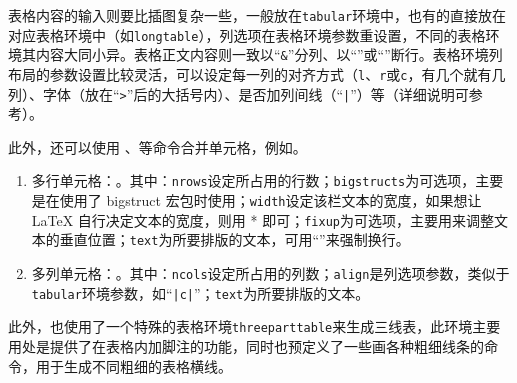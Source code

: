 表格内容的输入则要比插图复杂一些，一般放在\texttt{tabular}环境中，也有的直接放在对应表格环境中（如\texttt{longtable}），列选项在表格环境参数重设置，不同的表格环境其内容大同小异。表格正文内容则一致以“\texttt{\&}”分列、以“\ltxcmdname{\textbackslash}”或“”断行。表格环境列布局的参数设置比较灵活，可以设定每一列的对齐方式（\texttt{l}、\texttt{r}或\texttt{c}，有几个就有几列）、字体（放在“\texttt{>}”后的大括号内）、是否加列间线（“\texttt{|}”）等（详细说明可参考）。

此外，还可以使用 、等命令合并单元格，例如。
\begin{enumerate}
	\item 多行单元格：。其中：\texttt{nrows}设定所占用的行数；\texttt{bigstructs}为可选项，主要是在使用了 bigstruct 宏包时使用；\texttt{width}设定该栏文本的宽度，如果想让 LaTeX 自行决定文本的宽度，则用 * 即可；\texttt{fixup}为可选项，主要用来调整文本的垂直位置；\texttt{text}为所要排版的文本，可用“\ltxcmdname{\textbackslash}”来强制换行。
    \item 多列单元格：。其中：\texttt{ncols}设定所占用的列数；\texttt{align}是列选项参数，类似于\texttt{tabular}环境参数，如“\texttt{|c|}”；\texttt{text}为所要排版的文本。
\end{enumerate}

此外，也使用了一个特殊的表格环境\texttt{threeparttable}来生成三线表，此环境主要用处是提供了在表格内加脚注的功能，同时也预定义了一些画各种粗细线条的命令，用于生成不同粗细的表格横线。

